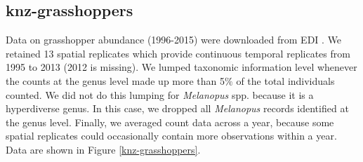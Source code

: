 \documentclass[11pt, oneside]{article}
\begin{document}
\subsection{knz-grasshoppers}
Data on grasshopper abundance (1996-2015) were downloaded from  EDI \citep{knz-grasshoppers}.
We retained 13 spatial replicates which provide continuous temporal replicates from 1995 to 2013 (2012 is missing). 
We lumped taxonomic information level whenever the counts at the genus level made up more than 5$\%$ of the total individuals counted. 
We did not do this lumping for {\it Melanopus} spp. because it is a hyperdiverse genus. 
In this case, we dropped all {\it Melanopus} records identified at the genus level. 
Finally, we averaged count data across a year, because some spatial replicates could occasionally contain more observations within a year.
Data are shown in Figure \ref{knz-grasshoppers}.
\end{document}

